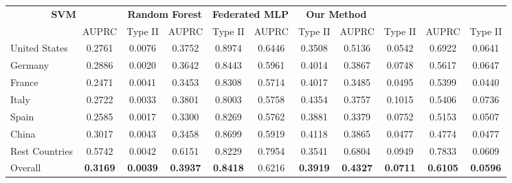 \documentclass[11pt,english]{article}
\begin{document}
\begin{table}[ht!]
{\begin{tabular}{l|cc|cc|cc|cc|cc}
\multicolumn{2}{c|}{\textbf{SVM}} &
\multicolumn{2}{c|}{\textbf{Random Forest}} &
\multicolumn{2}{c|}{\textbf{Federated MLP}} &
\multicolumn{2}{c}{\textbf{Our Method}} \\
& AUPRC  & Type II & AUPRC  & Type II & AUPRC  & Type II & AUPRC  & Type II & AUPRC  & Type II \\
\hline
United States   & 0.2761 & 0.0076 & 0.3752 & 0.8974 & 0.6446 & 0.3508 & 0.5136 & 0.0542 & 0.6922 & 0.0641 \\
Germany         & 0.2886 & 0.0020 & 0.3642 & 0.8443 & 0.5961 & 0.4014 & 0.3867 & 0.0748 & 0.5617 & 0.0647 \\
France          & 0.2471 & 0.0041 & 0.3453 & 0.8308 & 0.5714 & 0.4017 & 0.3485 & 0.0495 & 0.5399 & 0.0440 \\
Italy           & 0.2722 & 0.0033 & 0.3801 & 0.8003 & 0.5758 & 0.4354 & 0.3757 & 0.1015 & 0.5406 & 0.0736 \\
Spain           & 0.2585 & 0.0017 & 0.3300 & 0.8269 & 0.5762 & 0.3881 & 0.3379 & 0.0752 & 0.5153 & 0.0507 \\
China           & 0.3017 & 0.0043 & 0.3458 & 0.8699 & 0.5919 & 0.4118 & 0.3865 & 0.0477 & 0.4774 & 0.0477 \\
Rest Countries  & 0.5742 & 0.0042 & 0.6151 & 0.8229 & 0.7954 & 0.3541 & 0.6804 & 0.0949 & 0.7833 & 0.0609 \\
\hline
Overall         & \textbf{0.3169} & \textbf{0.0039} & \textbf{0.3937} & \textbf{0.8418} & 0.6216 & \textbf{0.3919} & \textbf{0.4327} & \textbf{0.0711} & \textbf{0.6105} & \textbf{0.0596} \\
\hline
\end{tabular}}
\label{subpopulation_shift_results}
\end{table}
\end{document}
